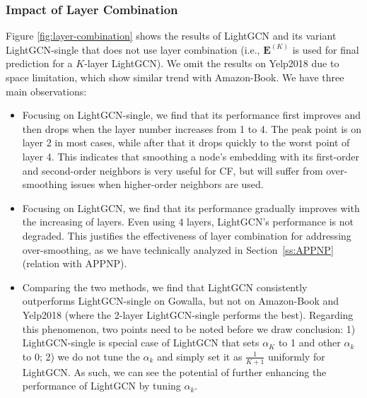 \subsubsection{Impact of Layer Combination} Figure \ref{fig:layer-combination} shows the results of LightGCN and its variant LightGCN-single that does not use layer combination (i.e., $\textbf{E}^{(K)}$ is used for final prediction for a $K$-layer LightGCN). We omit the results on Yelp2018 due to space limitation, which show similar trend with Amazon-Book. We have three main observations:
\begin{itemize}[leftmargin=*]
\item Focusing on LightGCN-single, we find that its performance first improves and then drops when the layer number increases from 1 to 4. The peak point is on layer 2 in most cases, while after that it drops quickly to the worst point of layer 4. This indicates that smoothing a node's embedding with its first-order and second-order neighbors is very useful for CF, but will suffer from over-smoothing issues when higher-order neighbors are used. 
\item Focusing on LightGCN, we find that its performance gradually improves with the increasing of layers. Even using 4 layers, LightGCN's performance is not degraded. This justifies the effectiveness of layer combination for addressing over-smoothing, as we have technically analyzed in Section~\ref{ss:APPNP} (relation with APPNP). 
\item Comparing the two methods, we find that LightGCN consistently outperforms LightGCN-single on Gowalla, but not on Amazon-Book and Yelp2018 (where the 2-layer LightGCN-single performs the best). Regarding this phenomenon, two points need to be noted before we draw conclusion: 1) LightGCN-single is special case of LightGCN that sets $\alpha_K$ to 1 and other $\alpha_k$ to 0; 2) we do not tune the $\alpha_k$ and simply set it as $\frac{1}{K+1}$ uniformly for LightGCN. As such, we can see the potential of further enhancing the performance of LightGCN by tuning $\alpha_k$. 
\end{itemize}


